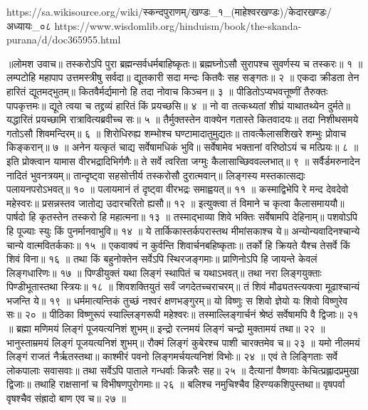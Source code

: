 https://sa.wikisource.org/wiki/स्कन्दपुराणम्/खण्डः_१_(माहेश्वरखण्डः)/केदारखण्डः/अध्यायः_०८
https://www.wisdomlib.org/hinduism/book/the-skanda-purana/d/doc365955.html

॥लोमश उवाच॥
तस्करोऽपि पुरा ब्रह्मन्सर्वधर्मबाहिष्कृतः॥
ब्रह्मघ्नोऽसौ सुरापश्च सुवर्णस्य च तस्करः॥ १ ॥
लम्पटोहि महापाप उत्तमस्त्रीषु सर्वदा॥
द्यूतकारी सदा मन्दः कितवैः सह सङ्गतः॥ २ ॥
एकदा क्रीडता तेन हारितं द्यूतमद्भुतम्॥
कितवैर्मर्द्यमानो हि तदा नोवाच किञ्चन॥ ३ ॥
पीडितोऽप्यभवत्तूष्णीं तैरुक्तः पापकृत्तमः॥
द्यूते त्वया च तद्द्रव्यं हारितं किं प्रयच्छसि॥ ४ ॥
नो वा तत्कथ्यतां शीघ्रं याथातथ्येन दुर्मते॥
यद्धारितं प्रयच्छामि रात्रावित्यब्रवीच्च सः॥ ५ ॥
तैर्मुक्तस्तेन वाक्येन गतास्ते कितवादयः॥
तदा निशीथसमये गतोऽसौ शिवमन्दिरम्॥ ६ ॥
शिरोधिरुह्य शम्भोश्च घण्टामादातुमुद्यतः॥
तावत्कैलासशिखरे शम्भुः प्रोवाच किङ्करान्॥ ७ ॥
अनेन यत्कृतं चाद्य सर्वेषामधिकं भुवि॥
सर्वेषामेव भक्तानां वरिष्ठोऽयं च मत्प्रियः॥ ८ ॥
इति प्रोक्त्वान यामास वीरभद्रादिभिर्गणैः॥
ते सर्वे त्वरिता जग्मुः कैलासाच्छिववल्लभात्॥ ९ ॥
सर्वैर्डमरुनादेन नादितं भुवनत्रयम्॥
तान्दृष्ट्वा सहसोत्तीर्य तस्करोसौ दुरात्मवान्॥
लिङ्गस्य मस्तकात्सद्यः पलायनपरोऽभवत्॥ १० ॥
पलायमानं तं दृष्ट्वा वीरभद्रः समाह्वयत्॥ ११ ॥
कस्माद्विभेपि रे मन्द देवदेवो महेस्वरः॥
प्रसन्नस्तव जातोद्य उदारचरितो ह्यसौ॥ १२ ॥
इत्युक्त्वा तं विमाने च कृत्वा कैलासमाययौ॥
पार्षदो हि कृतस्तेन तस्करो हि महात्मना॥ १३ ॥
तस्माद्भाव्या शिवे भक्तिः सर्वेषामपि देहिनाम्॥
पशवोऽपि हि पूज्याः स्युः किं पुनर्मानवाभुवि॥ १४ ॥
ये तार्किकास्तर्कपरास्तथ मीमांसकाश्च ये॥
अन्योन्यवादिनश्चान्ये चान्ये वात्मवितर्ककाः॥ १५ ॥
एकवाक्यं न कुर्वन्ति शिवार्चनबहिष्कृताः॥
तर्को हि क्रियते यैश्च तेसर्वे किं शिवं विना॥ १६ ॥
तथा किं बहुनोक्तेन सर्वेऽपि स्थिरजङ्गमाः॥
प्राणिनोऽपि हि जायन्ते केवलं लिङ्गधारिणः॥ १७ ॥
पिण्डीयुक्तं यथा लिङ्गं स्थापितं च यथाऽभवत्॥
तथा नरा लिङ्गयुक्ताः पिण्डीभूतास्तथा स्त्रियः॥ १८ ॥
शिवशक्तियुतं सर्वं जगदेतच्चराचरम्॥
तं शिवं मौढ्यतस्त्यक्त्वा मूढाश्चान्यं भजन्ति ये॥ १९ ॥
धर्ममात्यन्तिकं तुच्छं नश्वरं क्षणभङ्गुरम्॥
यो विष्णुः स शिवो ज्ञेयो यः शिवो विष्णुरेव सः॥ २० ॥
पीठिका विष्णुरूपं स्याल्लिङ्गरूपी महेश्वरः॥
तस्माल्लिङ्गार्चनं श्रेष्ठं सर्वेषामपि वै द्विजाः॥ २१ ॥
ब्रह्मा मणिमयं लिङ्गं पूजयत्यनिशं शुभम्॥
इन्द्रो रत्नमयं लिङ्गं चन्द्रो मुक्तामयं तथा॥ २२ ॥
भानुस्ताम्रमयं लिङ्गं पूजयत्यनिशं शुभम्॥
रौक्मं लिङ्गं कुबेरश्च पाशी चारक्तमेव च॥ २३ ॥
यमो नीलमयं लिङ्गं राजतं नैर्ऋतस्तथा॥
काश्मीरं पवनो लिङ्गमर्चयत्यनिशं विभोः॥ २४ ॥
एवं ते लिङ्गिताः सर्वे लोकपालाः सवासवाः॥
तथा सर्वेऽपि पाताले गन्धर्वाः किन्नरैः सह॥ २५ ॥
दैत्यानां वैष्णवाः केचित्प्रह्लादप्रमुखा द्विजाः॥
तथाहि राक्षसानां च विभीषणपुरोगमाः॥ २६ ॥
बलिश्च नमुचिश्चैव हिरण्यकशिपुस्तथा॥
वृषपर्वा वृषश्चैव संह्रादो बाण एव च॥ २७ ॥
